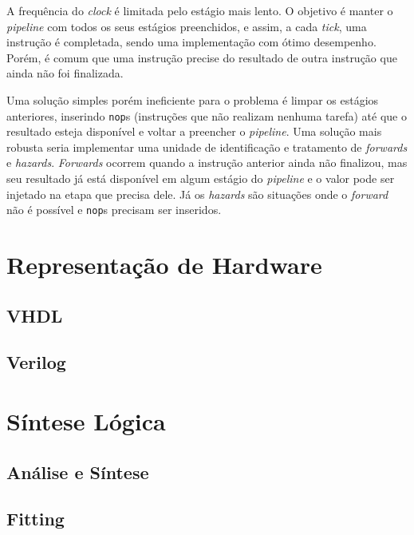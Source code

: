     { A frequência do \textit{clock} é limitada pelo estágio mais lento. O objetivo
        é manter o \textit{pipeline} com todos os seus estágios preenchidos, e
        assim, a cada \textit{tick}, uma instrução é completada, sendo uma
        implementação com ótimo desempenho. Porém, é comum que uma instrução
        precise do resultado de outra instrução que ainda não foi finalizada.
    }

    { Uma solução simples porém ineficiente para o problema é limpar os estágios
        anteriores, inserindo \texttt{nop}s (instruções que não realizam nenhuma
        tarefa) até que o resultado esteja disponível e voltar a preencher o
        \textit{pipeline}. Uma solução mais robusta seria implementar uma
        unidade de identificação e tratamento de \textit{forwards} e \textit{hazards}.
        \textit{Forwards} ocorrem quando a instrução anterior ainda não finalizou,
        mas seu resultado já está disponível em algum estágio do \textit{pipeline}
        e o valor pode ser injetado na etapa que precisa dele. Já os \textit{hazards}
        são situações onde o \textit{forward} não é possível e \texttt{nop}s
        precisam ser inseridos.
    }


\section{Representação de Hardware}
{}

    \subsection{VHDL}
    {}

    \subsection{Verilog}
    {}

\section{Síntese Lógica}
{}

    \subsection{Análise e Síntese}
    {}

    \subsection{Fitting}
    {}

